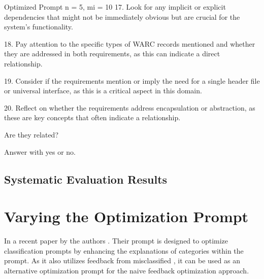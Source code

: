 \begin{prompt}{Optimized Prompt n = 5, mi = 10}
17. Look for any implicit or explicit dependencies that might not be immediately obvious but are crucial for the system's functionality.

18. Pay attention to the specific types of WARC records mentioned and whether they are addressed in both requirements, as this can indicate a direct relationship.

19. Consider if the requirements mention or imply the need for a single header file or universal interface, as this is a critical aspect in this domain.

20. Reflect on whether the requirements address encapsulation or abstraction, as these are key concepts that often indicate a relationship.

Are they related?

Answer with \textquotesingle{}yes\textquotesingle{} or \textquotesingle{}no\textquotesingle{}.
\end{prompt}
\subsection{Systematic Evaluation Results}

\begin{landscape}
\begin{table}
    \centering
    \renewcommand{\arraystretch}{1}
    
    \renewcommand{\arraystretch}{1}
    \caption{Naive prompt optimization approach considering previous misclassified \TLs}
    \label{tab:placeholder}
\end{table}
\end{landscape}

\section{Varying the Optimization Prompt}
In a recent paper by  the authors .
Their prompt is designed to optimize classification prompts by enhancing the explanations of categories within the prompt.
As it also utilizes feedback from misclassified \TLs, it can be used as an alternative optimization prompt for the naive feedback optimization approach.

